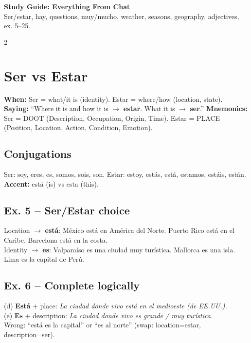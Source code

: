 \documentclass[9pt,a4paper]{article}
\begin{document}
\begin{center}
\vspace{0.2em}
{\large\bfseries\color{spanishgreen} Study Guide: Everything From Chat}\\[0.15em]
\footnotesize\textcolor{notegrey}{Ser/estar, hay, questions, muy/mucho, weather, seasons, geography, adjectives, ex. 5--25.}\\[0.3em]
\end{center}

\begin{multicols}{2}

\section*{\color{spanishgreen}Ser vs Estar}
\textbf{When:} Ser = what/it is (identity). Estar = where/how (location, state).
\textbf{Saying:} ``Where it is and how it is $\to$ \textbf{estar}. What it is $\to$ \textbf{ser}.''
\textbf{Mnemonics:} Ser = DOOT (Description, Occupation, Origin, Time). Estar = PLACE (Position, Location, Action, Condition, Emotion).

\subsection*{Conjugations}
\footnotesize
Ser: soy, eres, es, somos, sois, son. \quad Estar: estoy, est\'as, est\'a, estamos, est\'ais, est\'an.
\textbf{Accent:} est\'a (is) vs esta (this).

\subsection*{Ex. 5 -- Ser/Estar choice}
Location $\to$ \textbf{est\'a}: M\'exico est\'a en Am\'erica del Norte. Puerto Rico est\'a en el Caribe. Barcelona est\'a en la costa. \\
Identity $\to$ \textbf{es}: Valpara\'iso es una ciudad muy tur\'istica. Mallorca es una isla. Lima es la capital de Per\'u.

\subsection*{Ex. 6 -- Complete logically}
(d) \textbf{Est\'a} + place: \textit{La ciudad donde vivo est\'a en el medioeste (de EE.UU.).} \\
(e) \textbf{Es} + description: \textit{La ciudad donde vivo es grande / muy tur\'istica.} \\
Wrong: ``est\'a es la capital'' or ``es al norte'' (swap: location=estar, description=ser).


\end{multicols}
\end{document}
